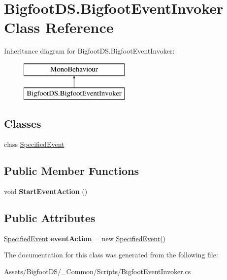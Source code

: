 \hypertarget{class_bigfoot_d_s_1_1_bigfoot_event_invoker}{}\section{Bigfoot\+D\+S.\+Bigfoot\+Event\+Invoker Class Reference}
\label{class_bigfoot_d_s_1_1_bigfoot_event_invoker}
Inheritance diagram for Bigfoot\+D\+S.\+Bigfoot\+Event\+Invoker\+:\begin{figure}[H]
\begin{center}
\leavevmode
\includegraphics[height=2.000000cm]{class_bigfoot_d_s_1_1_bigfoot_event_invoker}
\end{center}
\end{figure}
\subsection*{Classes}
\begin{DoxyCompactItemize}
\item 
class \mbox{\hyperlink{class_bigfoot_d_s_1_1_bigfoot_event_invoker_1_1_specified_event}{Specified\+Event}}
\end{DoxyCompactItemize}
\subsection*{Public Member Functions}
\begin{DoxyCompactItemize}
\item 
\mbox{\label{class_bigfoot_d_s_1_1_bigfoot_event_invoker_afd2da43c09f856aeae9c259dfec22c81}} 
void {\bfseries Start\+Event\+Action} ()
\end{DoxyCompactItemize}
\subsection*{Public Attributes}
\begin{DoxyCompactItemize}
\item 
\mbox{\label{class_bigfoot_d_s_1_1_bigfoot_event_invoker_adaaf1c060ccd20350f5d50955038c249}} 
\mbox{\hyperlink{class_bigfoot_d_s_1_1_bigfoot_event_invoker_1_1_specified_event}{Specified\+Event}} {\bfseries event\+Action} = new \mbox{\hyperlink{class_bigfoot_d_s_1_1_bigfoot_event_invoker_1_1_specified_event}{Specified\+Event}}()
\end{DoxyCompactItemize}


The documentation for this class was generated from the following file\+:\begin{DoxyCompactItemize}
\item 
Assets/\+Bigfoot\+D\+S/\+\_\+\+Common/\+Scripts/Bigfoot\+Event\+Invoker.\+cs\end{DoxyCompactItemize}
